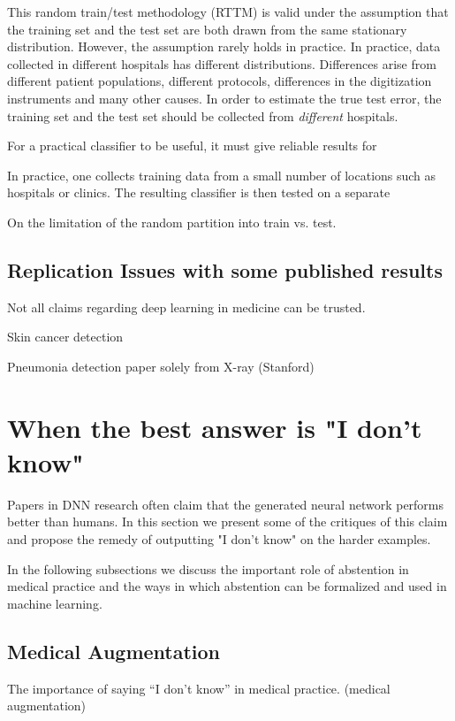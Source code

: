 \documentclass[fleqn,10pt]{wlscirep}
\begin{document}
This random train/test methodology (RTTM) is valid under the assumption that the training set and the test set are both drawn 
from the same stationary distribution. However, the assumption rarely holds in practice. In practice, data collected in different hospitals has different distributions. Differences arise from different patient populations, different protocols, differences in the digitization instruments and many other causes. In order to estimate the true test error, the training set and the test set should be collected from {\em different} hospitals.


For a practical classifier to be useful, it must give reliable results for 

In practice, one collects training data from a small number of locations such as hospitals or clinics. The resulting classifier is then tested on a separate 

On the limitation of the random partition into train vs. test.

\subsection*{Replication Issues with some published results}
Not all claims regarding deep learning in medicine can be trusted.

Skin cancer detection~\cite{esteva2017dermatologist}

Pneumonia detection paper solely from X-ray (Stanford)

\section{When the best answer is "I don't know"}

Papers in DNN research often claim that the generated neural network performs better than humans. In this section we present some of the critiques of this claim and propose the remedy of outputting "I don't know" on the harder examples.

In the following subsections we discuss the important role of abstention in medical practice and the ways in which abstention can be formalized and used in machine learning.

\subsection*{Medical Augmentation}
The importance of saying “I don’t know” in medical practice. (medical augmentation)
\end{document}
